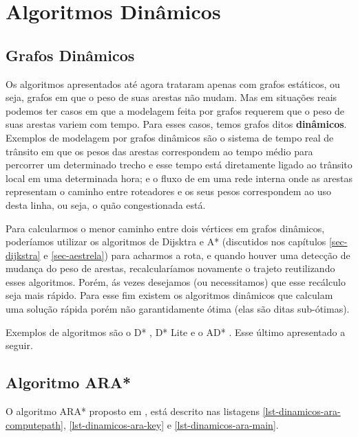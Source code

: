 \chapter{Algoritmos Dinâmicos}
\label{sec-dinamicos}

\section{Grafos Dinâmicos}
\label{sec-dinamicos-grafos}
Os algoritmos apresentados até agora trataram apenas com grafos estáticos, ou seja, grafos em que o peso de suas arestas não mudam. Mas em situações reais podemos ter casos em que a modelagem feita por grafos requerem que o peso de suas arestas variem com tempo. Para esses casos, temos grafos ditos \textbf{dinâmicos}. Exemplos de modelagem por grafos dinâmicos são o sistema de tempo real de trânsito em que os pesos das arestas correspondem ao tempo médio para percorrer um determinado trecho e esse tempo está diretamente ligado ao trânsito local em uma determinada hora; e o fluxo de em uma rede interna onde as arestas representam o caminho entre roteadores e os seus pesos correspondem ao uso desta linha, ou seja, o quão congestionada está.

Para calcularmos o menor caminho entre dois vértices em grafos dinâmicos, poderíamos utilizar os algoritmos de Dijsktra e A* (discutidos nos capítulos \ref{sec-dijkstra} e \ref{sec-aestrela})  para acharmos a rota, e quando houver uma detecção de mudança do peso de arestas, recalcularíamos novamente o trajeto reutilizando esses algoritmos. Porém, ás vezes desejamos (ou necessitamos) que esse recálculo seja mais rápido. Para esse fim existem os algoritmos dinâmicos que calculam uma solução rápida porém não garantidamente ótima (elas são ditas sub-ótimas).

Exemplos de algoritmos são o D* \cite{stentz1994optimal}, D* Lite \cite{koenig2002d} e o AD* \cite{likhachev2008anytime}. Esse último apresentado a seguir.
\section{Algoritmo ARA*}
\label{sec-dinamicos-ara}

O algoritmo ARA* proposto em , está descrito nas listagens \ref{lst-dinamicos-ara-computepath}, \ref{lst-dinamicos-ara-key} e \ref{lst-dinamicos-ara-main}.


